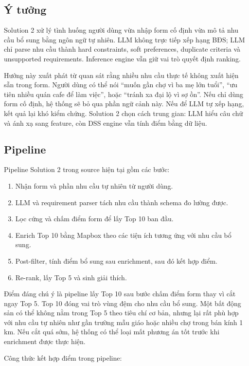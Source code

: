 \documentclass[a4paper,12pt]{article}
\begin{document}
\subsection{Ý tưởng}
Solution 2 xử lý tình huống người dùng vừa nhập form cố định vừa mô tả nhu cầu bổ sung bằng ngôn ngữ tự nhiên. LLM không trực tiếp xếp hạng BĐS; LLM chỉ parse nhu cầu thành hard constraints, soft preferences, duplicate criteria và unsupported requirements. Inference engine vẫn giữ vai trò quyết định ranking.

Hướng này xuất phát từ quan sát rằng nhiều nhu cầu thực tế không xuất hiện sẵn trong form. Người dùng có thể nói ``muốn gần chợ vì ba mẹ lớn tuổi'', ``ưu tiên nhiều quán cafe để làm việc'', hoặc ``tránh xa đại lộ vì sợ ồn''. Nếu chỉ dùng form cố định, hệ thống sẽ bỏ qua phần ngữ cảnh này. Nếu để LLM tự xếp hạng, kết quả lại khó kiểm chứng. Solution 2 chọn cách trung gian: LLM hiểu câu chữ và ánh xạ sang feature, còn DSS engine vẫn tính điểm bằng dữ liệu.

\subsection{Pipeline}
Pipeline Solution 2 trong source hiện tại gồm các bước:

\begin{enumerate}
    \item Nhận form và phần nhu cầu tự nhiên từ người dùng.
    \item LLM và requirement parser tách nhu cầu thành schema đo lường được.
    \item Lọc cứng và chấm điểm form để lấy Top 10 ban đầu.
    \item Enrich Top 10 bằng Mapbox theo các tiện ích tương ứng với nhu cầu bổ sung.
    \item Post-filter, tính điểm bổ sung sau enrichment, sau đó kết hợp điểm.
    \item Re-rank, lấy Top 5 và sinh giải thích.
\end{enumerate}

Điểm đáng chú ý là pipeline lấy Top 10 sau bước chấm điểm form thay vì cắt ngay Top 5. Top 10 đóng vai trò vùng đệm cho nhu cầu bổ sung. Một bất động sản có thể không nằm trong Top 5 theo tiêu chí cơ bản, nhưng lại rất phù hợp với nhu cầu tự nhiên như gần trường mẫu giáo hoặc nhiều chợ trong bán kính 1 km. Nếu cắt quá sớm, hệ thống có thể loại mất phương án tốt trước khi enrichment được thực hiện.

Công thức kết hợp điểm trong pipeline:
\end{document}
